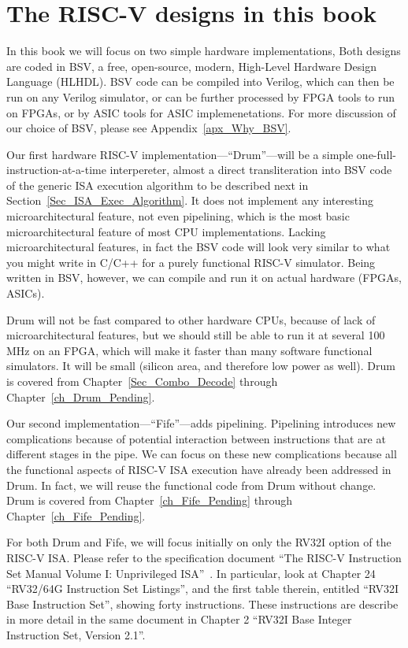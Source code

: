 
\section{The RISC-V designs in this book}

In this book we will focus on two simple hardware implementations,
Both designs are coded in BSV, a free, open-source, modern, High-Level
Hardware Design Language (HLHDL).  BSV code can be compiled into
Verilog, which can then be run on any Verilog simulator, or can be
further processed by FPGA tools to run on FPGAs, or by ASIC tools for
ASIC implemenetations.  For more discussion of our choice of BSV,
please see Appendix~\ref{apx_Why_BSV}.

Our first hardware RISC-V implementation---``Drum''---will be a
simple one-full-instruction-at-a-time interpereter, almost a direct
transliteration into BSV code of the generic ISA execution algorithm
to be described next in Section~\ref{Sec_ISA_Exec_Algorithm}.  It does
not implement any interesting microarchitectural feature, not even
pipelining, which is the most basic microarchitectural feature of most
CPU implementations.  Lacking microarchitectural features, in fact the
BSV code will look very similar to what you might write in C/C++ for a
purely functional RISC-V simulator.  Being written in BSV, however, we
can compile and run it on actual hardware (FPGAs, ASICs).

Drum will not be fast compared to other hardware CPUs, because of lack
of microarchitectural features, but we should still be able to run it
at several 100 MHz on an FPGA, which will make it faster than many
software functional simulators.  It will be small (silicon area, and
therefore low power as well).  Drum is covered from
Chapter~\ref{Sec_Combo_Decode} through Chapter~\ref{ch_Drum_Pending}.

Our second implementation---``Fife''---adds pipelining.  Pipelining
introduces new complications because of potential interaction between
instructions that are at different stages in the pipe.  We can focus
on these new complications because all the functional aspects of
RISC-V ISA execution have already been addressed in Drum.  In fact, we
will reuse the functional code from Drum without change.  Drum is
covered from Chapter~\ref{ch_Fife_Pending} through
Chapter~\ref{ch_Fife_Pending}.

For both Drum and Fife, we will focus initially on only the RV32I
option of the RISC-V ISA.  Please refer to the specification document
``The RISC-V Instruction Set Manual Volume I: Unprivileged
ISA''~\cite{RISCV_Unpriv_2019_12_13}.  In particular, look at Chapter
24 ``RV32/64G Instruction Set Listings'', and the first table therein,
entitled ``RV32I Base Instruction Set'', showing forty instructions.
These instructions are describe in more detail in the same document in
Chapter 2 ``RV32I Base Integer Instruction Set, Version 2.1''.

